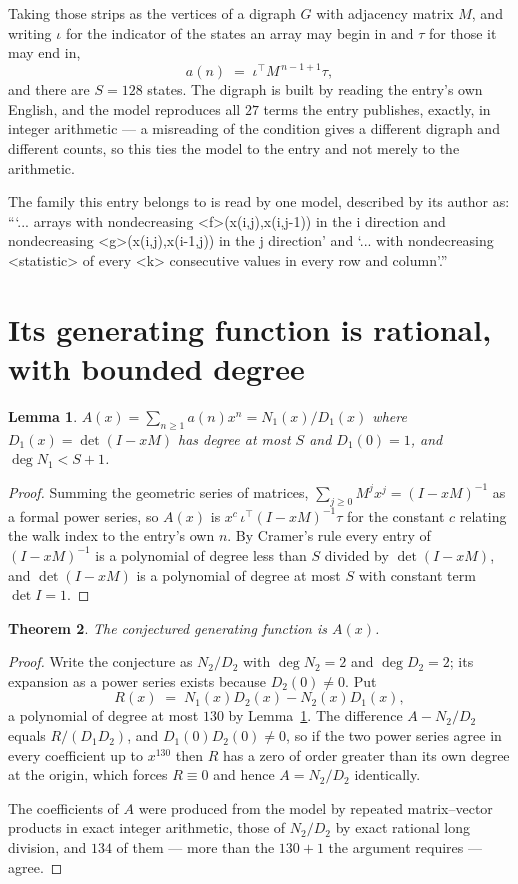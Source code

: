 \documentclass[11pt,a4paper]{article}
\theoremstyle{plain}
\newtheorem{theorem}{Theorem}
\newtheorem{lemma}[theorem]{Lemma}
\theoremstyle{definition}
\begin{document}
Taking those strips as the vertices of a digraph $G$ with adjacency matrix $M$, and writing
$\iota$ for the indicator of the states an array may begin in and $\tau$ for those it may end
in,
\[
a(n)\;=\;\iota^{\!\top}M^{\,n-1+1}\tau ,
\]
and there are $S=128$ states. The digraph is built by reading the entry's own English, and the
model reproduces all $27$ terms the entry publishes, exactly, in integer arithmetic --- a
misreading of the condition gives a different digraph and different counts, so this ties the
model to the entry and not merely to the arithmetic.

The family this entry belongs to is read by one model, described by its author as: ```... arrays with nondecreasing <f>(x(i,j),x(i,j-1)) in the i direction and nondecreasing <g>(x(i,j),x(i-1,j)) in the j direction' and `... with nondecreasing <statistic> of every <k> consecutive values in every row and column'.''


\section{Its generating function is rational, with bounded degree}

\begin{lemma}\label{lem:rat}
$A(x)=\sum_{n\ge1}a(n)x^n=N_1(x)/D_1(x)$ where $D_1(x)=\det(I-xM)$ has degree at most
$S$ and $D_1(0)=1$, and $\deg N_1<S+1$.
\end{lemma}

\begin{proof}
Summing the geometric series of matrices, $\sum_{j\ge0}M^jx^j=(I-xM)^{-1}$ as a formal
power series, so $A(x)$ is $x^{c}\,\iota^{\!\top}(I-xM)^{-1}\tau$ for the constant $c$
relating the walk index to the entry's own $n$. By Cramer's rule every entry of
$(I-xM)^{-1}$ is a polynomial of degree less than $S$ divided by $\det(I-xM)$, and
$\det(I-xM)$ is a polynomial of degree at most $S$ with constant term $\det I=1$.
\end{proof}

\begin{theorem}
The conjectured generating function is $A(x)$.
\end{theorem}

\begin{proof}
Write the conjecture as $N_2/D_2$ with $\deg N_2=2$ and $\deg D_2=2$; its expansion as a
power series exists because $D_2(0)\neq0$. Put
\[
R(x)\;=\;N_1(x)D_2(x)-N_2(x)D_1(x),
\]
a polynomial of degree at most $130$ by Lemma~\ref{lem:rat}. The difference
$A-N_2/D_2$ equals $R/(D_1D_2)$, and $D_1(0)D_2(0)\neq0$, so if the two power series agree in
every coefficient up to $x^{130}$ then $R$ has a zero of order greater than its own
degree at the origin, which forces $R\equiv0$ and hence $A=N_2/D_2$ identically.

The coefficients of $A$ were produced from the model by repeated matrix--vector products in
exact integer arithmetic, those of $N_2/D_2$ by exact rational long division, and $134$
of them --- more than the $130+1$ the argument requires --- agree.
\end{proof}
\end{document}
